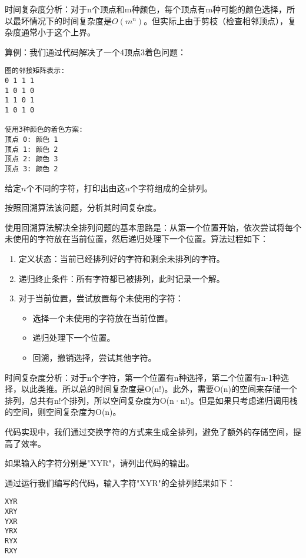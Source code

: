 \documentclass[12pt,twoside]{article}
\begin{document}
\begin{problems}
时间复杂度分析：对于n个顶点和m种颜色，每个顶点有m种可能的颜色选择，所以最坏情况下的时间复杂度是$O(m^n)$。但实际上由于剪枝（检查相邻顶点），复杂度通常小于这个上界。

算例：我们通过代码解决了一个4顶点3着色问题：
\begin{verbatim}
图的邻接矩阵表示:
0 1 1 1
1 0 1 0
1 1 0 1
1 0 1 0

使用3种颜色的着色方案:
顶点 0: 颜色 1
顶点 1: 颜色 2
顶点 2: 颜色 3
顶点 3: 颜色 2
\end{verbatim}

\eparts

\problem 给定$n$个不同的字符，打印出由这$n$个字符组成的全排列。

\bparts
\ppart 按照回溯算法该问题，分析其时间复杂度。

使用回溯算法解决全排列问题的基本思路是：从第一个位置开始，依次尝试将每个未使用的字符放在当前位置，然后递归处理下一个位置。算法过程如下：

\begin{enumerate}
    \item 定义状态：当前已经排列好的字符和剩余未排列的字符。
    \item 递归终止条件：所有字符都已被排列，此时记录一个解。
    \item 对于当前位置，尝试放置每个未使用的字符：
    \begin{itemize}
        \item 选择一个未使用的字符放在当前位置。
        \item 递归处理下一个位置。
        \item 回溯，撤销选择，尝试其他字符。
    \end{itemize}
\end{enumerate}

时间复杂度分析：对于n个字符，第一个位置有n种选择，第二个位置有n-1种选择，以此类推。所以总的时间复杂度是O(n!)。此外，需要O(n)的空间来存储一个排列，总共有n!个排列，所以空间复杂度为O(n·n!)。但是如果只考虑递归调用栈的空间，则空间复杂度为O(n)。

代码实现中，我们通过交换字符的方式来生成全排列，避免了额外的存储空间，提高了效率。

\ppart 如果输入的字符分别是"XYR"，请列出代码的输出。

通过运行我们编写的代码，输入字符"XYR"的全排列结果如下：
\begin{verbatim}
XYR
XRY
YXR
YRX
RYX
RXY
\end{verbatim}

\eparts



\end{problems}
\end{document}
